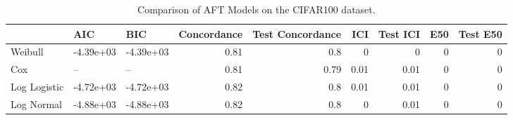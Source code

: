 \begin{table*}
\centering
\caption{Comparison of AFT Models on the CIFAR100 dataset.}
\label{tab:cifar100}
\begin{tabular}{lllrrrrrr}
\toprule
 & AIC & BIC & Concordance & Test Concordance & ICI & Test ICI & E50 & Test E50 \\
\midrule
Weibull & -4.39e+03 & -4.39e+03 & 0.81 & 0.8 & 0 & 0 & 0 & 0 \\
Cox & -- & -- & 0.81 & 0.79 & 0.01 & 0.01 & 0 & 0 \\
Log Logistic & -4.72e+03 & -4.72e+03 & 0.82 & 0.8 & 0.01 & 0.01 & 0 & 0 \\
Log Normal & -4.88e+03 & -4.88e+03 & 0.82 & 0.8 & 0 & 0.01 & 0 & 0 \\
\bottomrule
\end{tabular}
\end{table*}

